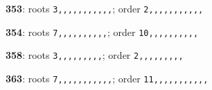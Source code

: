 \noindent \textbf{353}: roots \texttt{3,,,,,,,,,,,}; order \texttt{2,,,,,,,,,,,}\par
\noindent \textbf{354}: roots \texttt{7,,,,,,,,,,}; order \texttt{10,,,,,,,,,,}\par
\noindent \textbf{358}: roots \texttt{3,,,,,,,,,}; order \texttt{2,,,,,,,,,}\par
\noindent \textbf{363}: roots \texttt{7,,,,,,,,,,,}; order \texttt{11,,,,,,,,,,,}\par
